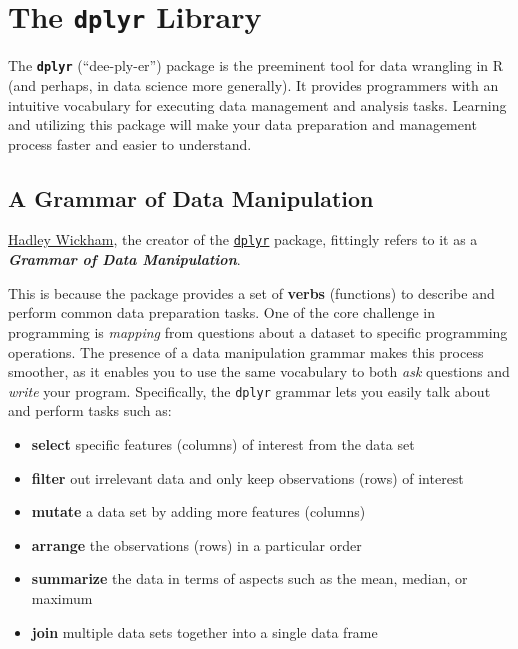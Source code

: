 \documentclass[]{book}
\providecommand{\tightlist}{%
  \setlength{\itemsep}{0pt}\setlength{\parskip}{0pt}}
\theoremstyle{definition}
\theoremstyle{definition}
\theoremstyle{remark}
\begin{document}
\chapter{\texorpdfstring{The \texttt{dplyr}
Library}{The dplyr Library}}\label{dplyr}

The \textbf{\texttt{dplyr}} (``dee-ply-er'') package is the preeminent
tool for data wrangling in R (and perhaps, in data science more
generally). It provides programmers with an intuitive vocabulary for
executing data management and analysis tasks. Learning and utilizing
this package will make your data preparation and management process
faster and easier to understand.

\section{A Grammar of Data
Manipulation}\label{a-grammar-of-data-manipulation}

\href{http://hadley.nz/}{Hadley Wickham}, the creator of the
\href{https://github.com/hadley/dplyr}{\texttt{dplyr}} package,
fittingly refers to it as a \textbf{\emph{Grammar of Data
Manipulation}}.

This is because the package provides a set of \textbf{verbs} (functions)
to describe and perform common data preparation tasks. One of the core
challenge in programming is \emph{mapping} from questions about a
dataset to specific programming operations. The presence of a data
manipulation grammar makes this process smoother, as it enables you to
use the same vocabulary to both \emph{ask} questions and \emph{write}
your program. Specifically, the \texttt{dplyr} grammar lets you easily
talk about and perform tasks such as:

\begin{itemize}
\tightlist
\item
  \textbf{select} specific features (columns) of interest from the data
  set
\item
  \textbf{filter} out irrelevant data and only keep observations (rows)
  of interest
\item
  \textbf{mutate} a data set by adding more features (columns)
\item
  \textbf{arrange} the observations (rows) in a particular order
\item
  \textbf{summarize} the data in terms of aspects such as the mean,
  median, or maximum
\item
  \textbf{join} multiple data sets together into a single data frame 
\end{itemize}
\end{document}
